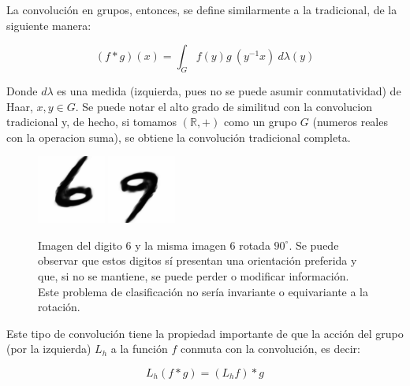 \documentclass[12pt,letterpaper,final, openany]{scrbook}
\begin{document}
La convolución en grupos, entonces, se define similarmente a la tradicional, de la siguiente manera:

\begin{equation}
(f * g)(x) = \int_{G} f(y)g\ (y^{-1} x)\  d\lambda(y)
\end{equation}

Donde $d\lambda$ es una medida (izquierda, pues no se puede asumir conmutatividad) de Haar, $x,y \in G$. Se puede notar el alto grado de similitud con la convolucion tradicional y, de hecho, si tomamos $(\mathbb{R},+)$ como un grupo $G$ (numeros reales con la operacion suma), se obtiene la convolución tradicional completa.

\begin{figure}[h!]
    \centering
    \includegraphics[width=0.2\textwidth]{6.png}
    \includegraphics[width=0.2\textwidth]{9.png}
    \caption{Imagen del digito $6$ y la misma imagen $6$ rotada $90 ^{\circ}$. Se puede observar que estos digitos sí presentan una orientación preferida y que, si no se mantiene, se puede perder o modificar información. Este problema de clasificación no sería invariante o equivariante a la rotación.}
    \label{fig:69}
\end{figure}

Este tipo de convolución tiene la propiedad importante de que la acción del grupo (por la izquierda) $L_{h}$ a la función $f$ conmuta con la convolución, es decir:

\begin{equation}
L_{h}(f * g) = (L_{h}f) * g
\end{equation}
\end{document}
